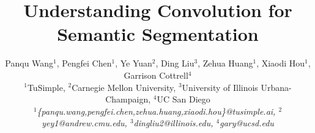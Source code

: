 \documentclass[10pt,twocolumn,letterpaper]{article}
\begin{document}
\title{Understanding Convolution for Semantic Segmentation}

\author[Wang et al.]{Panqu Wang$^1$, Pengfei Chen$^1$, Ye Yuan$^{2}$,
       Ding Liu$^3$, Zehua Huang$^1$, Xiaodi Hou$^1$, 
       Garrison Cottrell$^4$\\
       $^1$TuSimple, 
       $^2$Carnegie Mellon University, 
       $^3$University of Illinois Urbana-Champaign, 
       $^4$UC San Diego\\
       \textit{$^1$\{panqu.wang,pengfei.chen,zehua.huang,xiaodi.hou\}@tusimple.ai,
       	       $^2$yey1@andrew.cmu.edu,
               $^3$dingliu2@illinois.edu,
               $^4$gary@ucsd.edu} 
       }
\maketitle
\ifwacvfinal\thispagestyle{empty}\fi
\end{document}
